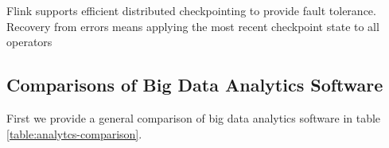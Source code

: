\documentclass[]{article}
\begin{document}
Flink supports efficient distributed checkpointing to provide fault tolerance. Recovery from errors means applying the most recent checkpoint state to all operators






\subsection{Comparisons of Big Data Analytics Software}
First we provide a general comparison of big data analytics software in table \ref{table:analytcs-comparison}.
\end{document}
